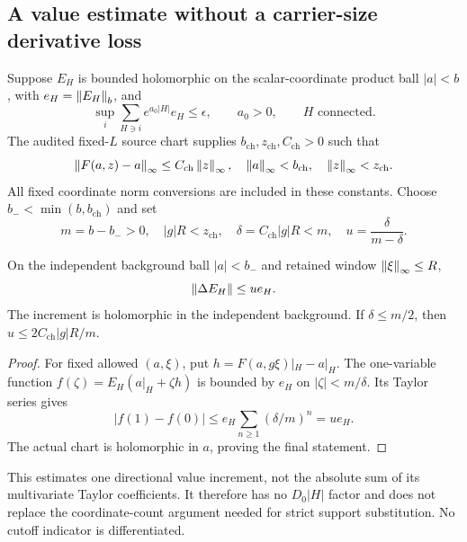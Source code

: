 \subsection{A value estimate without a carrier-size derivative loss}

Suppose $E_H$ is bounded holomorphic on the scalar-coordinate
product ball $|a|<b$, with $e_H=\left\|E_H\right\|_b$, and
\begin{equation}\label{qi-inherited-norm}
 \sup_i\sum_{H\ni i}e^{a_0|H|}e_H\le\epsilon,
 \qquad a_0>0,\qquad H\text{ connected}.
\end{equation}
The audited fixed-$L$ source chart supplies
$b_{\mathrm{ch}},z_{\mathrm{ch}},C_{\mathrm{ch}}>0$ such that
\begin{equation}\label{qi-displacement}
 \left\|F(a,z)-a\right\|_\infty\le C_{\mathrm{ch}}\left\|z\right\|_\infty,
 \quad \left\|a\right\|_\infty<b_{\mathrm{ch}},\quad
       \left\|z\right\|_\infty<z_{\mathrm{ch}}.
\end{equation}
All fixed coordinate norm conversions are included in these constants.
Choose $b_-<\min(b,b_{\mathrm{ch}})$ and set
\begin{equation}\label{qi-domain-budget}
 m=b-b_->0,\quad |g|R<z_{\mathrm{ch}},\quad
 \delta=C_{\mathrm{ch}}|g|R<m,\quad
 u=\frac{\delta}{m-\delta}.
\end{equation}

\begin{lemma}\label{qi-increment-lemma}
On the independent background ball $|a|<b_-$ and retained
window $\left\|\xi\right\|_\infty\le R$,
\begin{equation}\label{qi-increment-bound}
 \left\|\Delta E_H\right\|\le u e_H.
\end{equation}
The increment is holomorphic in the independent background.
If $\delta\le m/2$, then $u\le2C_{\mathrm{ch}}|g|R/m$.
\end{lemma}
\begin{proof}
For fixed allowed $(a,\xi)$, put
$h=F(a,g\xi)|_H-a|_H$. The one-variable function
$f(\zeta)=E_H(a|_H+\zeta h)$ is bounded by $e_H$ on
$|\zeta|<m/\delta$. Its Taylor series gives
\[
 |f(1)-f(0)|\le e_H\sum_{n\ge1}(\delta/m)^n=u e_H.
\]
The actual chart is holomorphic in $a$, proving the final statement.
\end{proof}
This estimates one directional value increment, not the absolute
sum of its multivariate Taylor coefficients. It therefore has
no $D_0|H|$ factor and does not replace the coordinate-count
argument needed for strict support substitution. No cutoff
indicator is differentiated.

